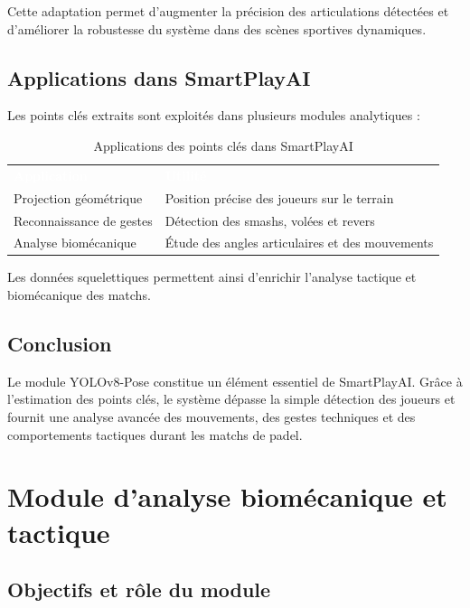 Cette adaptation permet d’augmenter la précision des articulations détectées et d’améliorer la robustesse du système dans des scènes sportives dynamiques.

\subsection{Applications dans SmartPlayAI}

Les points clés extraits sont exploités dans plusieurs modules analytiques :

\begin{table}[H]
  \centering
  \renewcommand{\arraystretch}{1.3}
  \begin{tabularx}{\textwidth}{C{4cm} X}
    \textcolor{white}{\textbf{Application}} &
    \textcolor{white}{\textbf{Utilité}} \\
    Projection géométrique & Position précise des joueurs sur le terrain \\
    Reconnaissance de gestes & Détection des smashs, volées et revers \\
    Analyse biomécanique & Étude des angles articulaires et des mouvements \\
  \end{tabularx}
  \caption{Applications des points clés dans SmartPlayAI}
  \label{tab:applications_keypoints}
\end{table}

Les données squelettiques permettent ainsi d’enrichir l’analyse tactique et biomécanique des matchs.

\subsection{Conclusion}

Le module YOLOv8-Pose constitue un élément essentiel de SmartPlayAI. Grâce à l’estimation des points clés, le système dépasse la simple détection des joueurs et fournit une analyse avancée des mouvements, des gestes techniques et des comportements tactiques durant les matchs de padel.
\section{Module d'analyse biomécanique et tactique}

\subsection{Objectifs et rôle du module}

